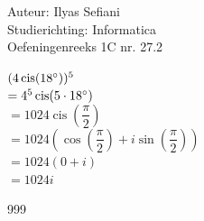 \documentclass[a4paper]{article}
\begin{document}
\noindent \large Auteur: Ilyas Sefiani \\
\noindent \large Studierichting: Informatica\\
\noindent \large Oefeningenreeks 1C nr. 27.2\\

\medskip

\normalsize 

$(4\operatorname{cis}(18\degree))^5$\\

$= 4^5\operatorname{cis}(5\cdot18\degree)$\\

$= 1024\operatorname{cis}\left(\dfrac{\pi}{2}\right)$\\

$= 1024\left(\cos\left(\dfrac{\pi}{2}\right) + i\sin\left(\dfrac{\pi}{2}\right)\right)$\\

$= 1024(0+i)$\\

$= 1024i$\\



\begin{thebibliography}{999}
\end{thebibliography}
\end{document}
